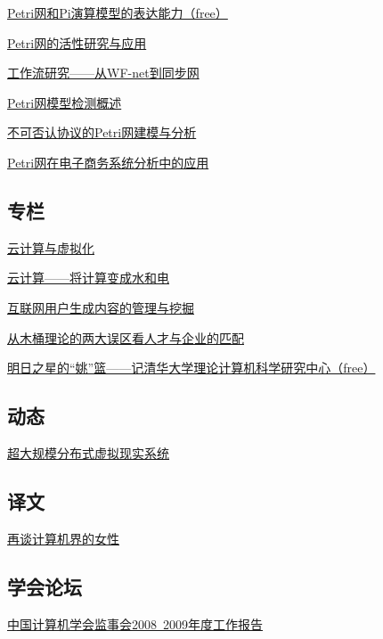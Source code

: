 \documentclass[a4paper]{article}
\begin{document}
\href{http://history.ccf.org.cn/resources/1190201776262/2010/04/15/044008.pdf}{Petri网和Pi演算模型的表达能力（free）}

\href{http://history.ccf.org.cn/resources/1190201776262/2010/04/15/044012.pdf}{Petri网的活性研究与应用}

\href{http://history.ccf.org.cn/resources/1190201776262/2010/04/15/044016.pdf}{工作流研究——从WF-net到同步网}

\href{http://history.ccf.org.cn/resources/1190201776262/2010/04/15/044021.pdf}{Petri网模型检测概述}

\href{http://history.ccf.org.cn/resources/1190201776262/2010/04/15/044028.pdf}{不可否认协议的Petri网建模与分析}

\href{http://history.ccf.org.cn/resources/1190201776262/2010/04/15/044036.pdf}{Petri网在电子商务系统分析中的应用}

\subsection{专栏}
\href{http://history.ccf.org.cn/resources/1190201776262/2010/04/15/044045.pdf}{云计算与虚拟化}

\href{http://history.ccf.org.cn/resources/1190201776262/2010/04/15/044049.pdf}{云计算——将计算变成水和电}

\href{http://history.ccf.org.cn/resources/1190201776262/2010/04/15/044055.pdf}{互联网用户生成内容的管理与挖掘}

\href{http://history.ccf.org.cn/resources/1190201776262/2010/04/15/044060.pdf}{从木桶理论的两大误区看人才与企业的匹配}

\href{http://history.ccf.org.cn/resources/1190201776262/2010/04/15/044040.pdf}{明日之星的“姚”篮——记清华大学理论计算机科学研究中心（free）}

\subsection{动态}
\href{http://history.ccf.org.cn/resources/1190201776262/2010/04/15/044062.pdf}{超大规模分布式虚拟现实系统}

\subsection{译文}
\href{http://history.ccf.org.cn/resources/1190201776262/2010/04/15/044070.pdf}{再谈计算机界的女性}

\subsection{学会论坛}
\href{http://history.ccf.org.cn/resources/1190201776262/2010/04/15/044092.pdf}{中国计算机学会监事会2008~2009年度工作报告}
\end{document}
